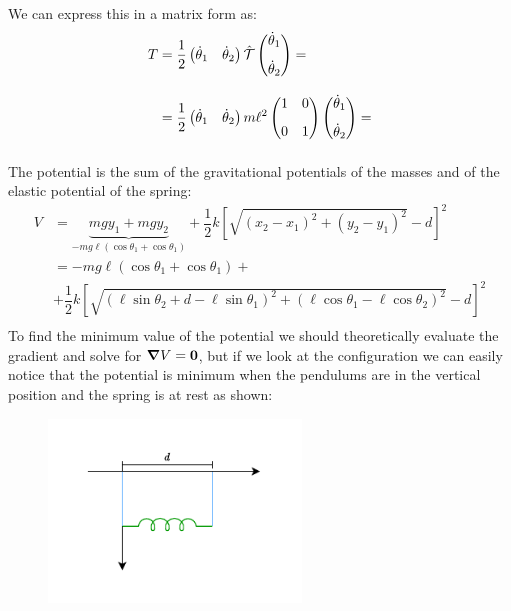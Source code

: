 We can express this in a matrix form as:
\begin{equation}
    \begin{split}
        T &= \dfrac{1}{2}\begin{pmatrix}
        \dot{\theta}_1 & \dot{\theta}_2
        \end{pmatrix}\hat{\mathcal{T}}\begin{pmatrix}
            \dot{\theta}_1 \\[8pt]\dot{\theta}_2
        \end{pmatrix} = \\[8pt]
        &= \dfrac{1}{2}\begin{pmatrix}
        \dot{\theta}_1 & \dot{\theta}_2
        \end{pmatrix}m\ell^2\begin{pmatrix}
            1 & 0\\[8pt]
            0 & 1
        \end{pmatrix}
        \begin{pmatrix}
            \dot{\theta}_1 \\[8pt]\dot{\theta}_2
        \end{pmatrix} = \\[8pt]
    \end{split}
\end{equation}
The potential is the sum of the gravitational potentials of the masses and of the elastic potential of the spring:
\begin{equation}
    \begin{split}
        V &= \underbrace{mgy_1 + mgy_2}_{-mg\ell(\cos\theta_1+\cos\theta_1)} + \dfrac{1}{2}k\left[\sqrt{(x_2-x_1)^2+(y_2-y_1)^2}-d\right]^2\\[8pt]
        &= -mg\ell(\cos\theta_1+\cos\theta_1) +\\[8pt]
        &+ \dfrac{1}{2}k\left[\sqrt{(\ell\sin\theta_2+d-\ell\sin\theta_1)^2+(\ell\cos\theta_1-\ell\cos\theta_2)^2}-d\right]^2\\[8pt]
    \end{split}
\end{equation}
To find the minimum value of the potential we should theoretically evaluate the gradient and solve for $\grad V = \vb{0}$, but if we look at the configuration we can easily notice that the potential is minimum when the pendulums are in the vertical position and the spring is at rest as shown:
\begin{figure}[H]
    \centering
    \includegraphics[width=0.6\textwidth]{res/svg/couple_pendulum_still.drawio}
\end{figure}
